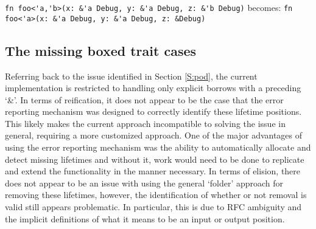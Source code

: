\begin{fig}
{\verb|fn foo<'a,'b>(x: &'a Debug, y: &'a Debug, z: &'b Debug)|}\newline
becomes: {\verb|fn foo<'a>(x: &'a Debug, y: &'a Debug, z: &Debug)|}
\caption{Partial elision -- only \emph{'b} removed}
\label{Fig:partial}
\end{fig}


\subsection{The missing boxed trait cases}
Referring back to the issue identified in Section \ref{S:pod}, the current implementation is restricted to handling only explicit borrows with a preceding `\&'. In terms of reification, it does not appear to be the case that the error reporting mechanism was designed to correctly identify these lifetime positions. This likely makes the current approach incompatible to solving the issue in general, requiring a more customized approach. One of the major advantages of using the error reporting mechanism was the ability to automatically allocate and detect missing lifetimes and without it, work would need to be done to replicate and extend the functionality in the manner necessary. In terms of elision, there does not appear to be an issue with using the general `folder' approach for removing these lifetimes, however, the identification of whether or not removal is valid still appears problematic. In particular, this is due to RFC ambiguity and the implicit definitions of what it means to be an input or output position.




